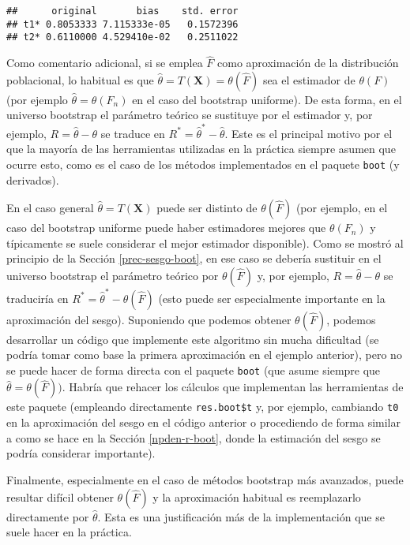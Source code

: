 \documentclass[
]{book}
\theoremstyle{break}
\theoremstyle{definition}
\theoremstyle{definition}
\theoremstyle{definition}
\theoremstyle{remark}
\begin{document}
\begin{verbatim}
##      original       bias    std. error
## t1* 0.8053333 7.115333e-05   0.1572396
## t2* 0.6110000 4.529410e-02   0.2511022
\end{verbatim}

Como comentario adicional, si se emplea \(\hat F\) como aproximación de la distribución poblacional, lo habitual es que \(\hat\theta = T\left( \mathbf{X} \right) = \theta ( \hat{F} )\) sea el estimador de \(\theta(F)\) (por ejemplo \(\hat\theta = \theta(F_n)\) en el caso del bootstrap uniforme).
De esta forma, en el universo bootstrap el parámetro teórico se sustituye por el estimador y, por ejemplo, \(R = \hat \theta - \theta\) se traduce en \(R^{\ast} = \hat{\theta}^{\ast}- \hat \theta\).
Este es el principal motivo por el que la mayoría de las herramientas utilizadas en la práctica siempre asumen que ocurre esto, como es el caso de los métodos implementados en el paquete \texttt{boot} (y derivados).

En el caso general \(\hat\theta = T\left( \mathbf{X} \right)\) puede ser distinto de \(\theta ( \hat{F} )\) (por ejemplo, en el caso del bootstrap uniforme puede haber estimadores mejores que \(\theta( F_n)\) y típicamente se suele considerar el mejor estimador disponible).
Como se mostró al principio de la Sección \ref{prec-sesgo-boot}, en ese caso se debería sustituir en el universo bootstrap el parámetro teórico por \(\theta ( \hat{F} )\) y, por ejemplo, \(R = \hat \theta - \theta\) se traduciría en \(R^{\ast} = \hat \theta^{\ast} - \theta ( \hat{F} )\) (esto puede ser especialmente importante en la aproximación del sesgo).
Suponiendo que podemos obtener \(\theta ( \hat{F} )\), podemos desarrollar un código que implemente este algoritmo sin mucha dificultad (se podría tomar como base la primera aproximación en el ejemplo anterior), pero no se puede hacer de forma directa con el paquete \texttt{boot} (que asume siempre que \(\hat\theta = \theta ( \hat{F} ))\).
Habría que rehacer los cálculos que implementan las herramientas de este paquete (empleando directamente \texttt{res.boot\$t} y, por ejemplo, cambiando \texttt{t0} en la aproximación del sesgo en el código anterior o procediendo de forma similar a como se hace en la Sección \ref{npden-r-boot}, donde la estimación del sesgo se podría considerar importante).

Finalmente, especialmente en el caso de métodos bootstrap más avanzados, puede resultar difícil obtener \(\theta ( \hat{F} )\) y la aproximación habitual es reemplazarlo directamente por \(\hat \theta\).
Esta es una justificación más de la implementación que se suele hacer en la práctica.
\end{document}
